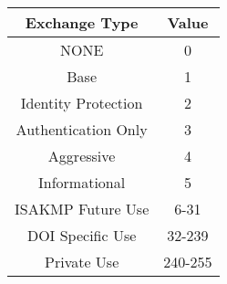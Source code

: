 \begin{tabular}{|c|c|}
\toprule
\textbf{Exchange Type} & \textbf{Value}  \\
\midrule
NONE & 0  \\
\midrule
Base & 1  \\
\midrule
Identity Protection & 2 \\
\midrule
Authentication Only & 3 \\
\midrule
Aggressive & 4 \\
\midrule
Informational & 5 \\
\midrule
ISAKMP Future Use & 6-31 \\
\midrule
DOI Specific Use & 32-239 \\
\midrule
Private Use & 240-255 \\
\bottomrule
\end{tabular}